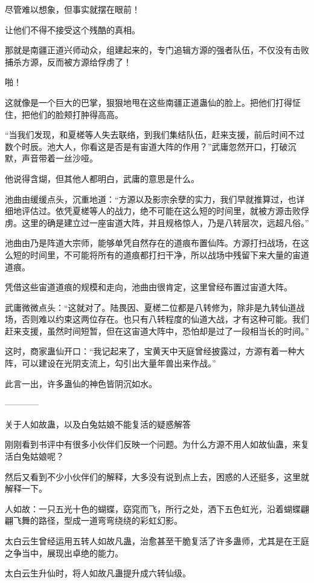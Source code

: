 \begin{this_body}
尽管难以想象，但事实就摆在眼前！

让他们不得不接受这个残酷的真相。

那就是南疆正道兴师动众，组建起来的，专门追辑方源的强者队伍，不仅没有击败捕杀方源，反而被方源给俘虏了！

啪！

这就像是一个巨大的巴掌，狠狠地甩在这些南疆正道蛊仙的脸上。把他们打得怔住，把他们的脸颊打肿得高高。

“当我们发现，和夏槎等人失去联络，到我们集结队伍，赶来支援，前后时间不过数个时辰。池大人，你看这是否是有宙道大阵的作用？”武庸忽然开口，打破沉默，声音带着一丝沙哑。

他说得含煳，但其他人都明白，武庸的意思是什么。

池曲由缓缓点头，沉重地道：“方源以及影宗余孽的实力，我们早就推算过，也详细地评估过。依凭夏槎等人的战力，绝不可能在这么短的时间里，就被方源击败俘虏。这里的确是建立过一座宙道大阵，并且规格惊人，乃是八转层次，远超凡俗。”

池曲由乃是阵道大宗师，能够单凭自然存在的道痕布置仙阵。方源打扫战场，在这么短的时间里，不可能将所有的道痕都打扫干净，所以战场中残留下来大量的宙道道痕。

凭借这些宙道道痕的规模和走向，池曲由很肯定，这里曾经布置过宙道大阵。

武庸微微点头：“这就对了。陆畏因、夏槎二位都是八转修为，除非是九转仙道战场，否则难以约束这两位存在。也只有八转程度的仙道大战，才有这种可能。我们赶来支援，虽然时间短暂，但在这宙道大阵中，恐怕却是过了一段相当长的时间。”

这时，商家蛊仙开口：“我记起来了，宝黄天中天庭曾经披露过，方源有着一种大阵，可以建设在光阴支流上，勾引出大量年兽出来作战。”

此言一出，许多蛊仙的神色皆阴沉如水。

------------

关于人如故蛊，以及白兔姑娘不能复活的疑惑解答

刚刚看到书评中有很多小伙伴们反映一个问题。为什么方源不用人如故仙蛊，来复活白兔姑娘呢？

然后又看到不少小伙伴们的解释，大多没有说到点上去，困惑的人还挺多，这里就解释一下。

人如故：一只五光十色的蝴蝶，窈窕而飞，所行之处，洒下五色虹光，沿着蝴蝶翩翩飞舞的路径，型成一道弯弯绕绕的彩虹幻影。

太白云生曾经运用五转人如故凡蛊，治愈甚至干脆复活了许多蛊师，尤其是在王庭之争当中，展现出卓绝的能力。

太白云生升仙时，将人如故凡蛊提升成六转仙级。


\end{this_body}
